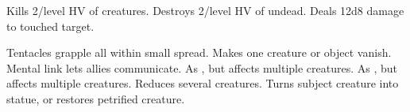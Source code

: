 \begin{swspelllist}
  \M Kills 2/level HV of creatures.
  \M Destroys 2/level HV of undead.
   Deals 12d8 damage to touched target.
  \spellheadrestrictedc{}

   Tentacles grapple all within small spread.
   Makes one creature or object vanish.
   Mental link lets allies communicate.
   As , but affects multiple creatures.
   As , but affects multiple creatures.
   Reduces several creatures.
   Turns subject creature into statue, or restores petrified creature.
\end{swspelllist}

